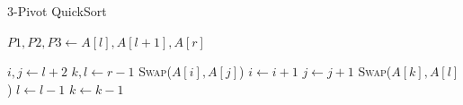 \documentclass{article}
\begin{document}
\begin{algorithm}[H]
    \caption{3-Pivot QuickSort}\label{3PivotQuickSort}
    \begin{algorithmic}[1]
        \State $P1, P2, P3 \gets A[l], A[l+1], A[r]$  

        \State $i, j \gets l + 2$
        \State $k, l \gets r - 1$
             
                    \State \textsc{Swap}($A[i], A[j]$)
                    \State $i \gets i + 1$
                \EndIf
                \State $j \gets j + 1$
            \EndWhile
             
                    \State \textsc{Swap}($A[k], A[l]$)
                    \State $l \gets l - 1$
                \EndIf
                \State $k \gets k - 1$
            \EndWhile

\end{algorithmic}
\end{algorithm}
\end{document}
